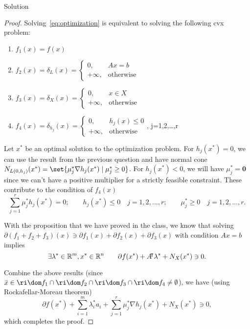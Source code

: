 \documentclass{article}
\begin{document}
\begin{solution}
    {Solution}
    \begin{proof}
        Solving~\cref{eq:optimization} is equivalent to solving the following cvx problem:
        \begin{enumerate}
            \item $f_1(x)=f(x)$
            \item $f_2(x)=\delta_L(x)=\begin{cases}
                0, & Ax = b \\
                +\infty, & \text{otherwise}
            \end{cases}$
            \item $f_3(x)=\delta_X(x)=\begin{cases}
                0, & x\in X \\
                +\infty, & \text{otherwise}
            \end{cases}$
            \item $f_4(x)=\delta_{h_j}(x)=\begin{cases}
                0, & h_j(x)\leq 0\\
                +\infty, & \text{otherwise}
            \end{cases}$, j=1,2,\dots,r 
        \end{enumerate}
        Let $x^*$ be an optimal solution to the optimization problem. For $h_j(x^*)=0$, we can use the result from the previous question and have normal cone $N_{L(0,h_j)}(x^*)=\set{\mu_j^*\nabla h_j(x^*)\mid \mu_j^*\geq 0}$. For $h_j(x^*)<0$, we will have $\mu_j^*=\bm{0}$ since we can't have a positive multiplier for a strictly feasible constraint. These contribute to the condition of $f_4(x)$ \[\sum_{j=1}^{r}\mu^*_j h_j(x^*) = 0; \qquad h_j(x^*) \leq 0 \quad j=1,2,\dots,r; \qquad \mu^*_j \geq 0 \quad j=1,2,\dots,r.\]

        With the proposition that we have proved in the class, we know that solving $\partial(f_1+f_2+f_3)(x)\ni\partial f_1(x)+\partial f_2(x) + \partial f_3(x)$ with condition $Ax=b$ implies \[\exists \lambda^*\in\mathbb{R}^m, x^*\in\mathbb{R}^n \qquad \partial f(x^*) + A{}^{\mkern-4mu\intercal}\lambda^* + N_X(x^*) \ni 0.\]

        Combine the above results (since $\bar{x}\in\ri\dom f_1\cap\ri\dom f_2\cap\ri\dom f_3\cap\ri\dom f_4\neq\emptyset$), we have (using Rockafellar-Moreau theorem) \[\partial f(x^*)+\sum_{i=1}^{m}\lambda^*_i a_i+\sum_{j=1}^{r}\mu^*_j\nabla h_j(x^*)+N_X(x^*) \ni 0,\] which completes the proof.
    \end{proof}
\end{solution}
\end{document}
